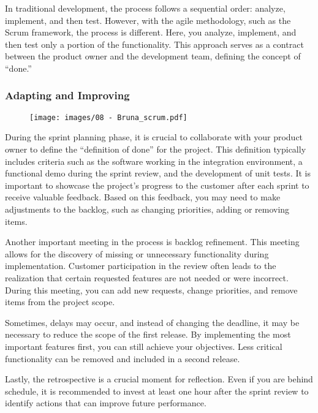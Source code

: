 In traditional development, the process follows a sequential order:
analyze, implement, and then test. However, with the agile methodology,
such as the Scrum framework, the process is different. Here, you
analyze, implement, and then test only a portion of the functionality.
This approach serves as a contract between the product owner and the
development team, defining the concept of ``done.''

\subsubsection{Adapting and Improving}

\begin{figure}[!h]
  \centering
  \texttt{[image: images/08 - Bruna\_scrum.pdf]}
\end{figure}

During the sprint planning phase, it is crucial to collaborate with your
product owner to define the ``definition of done'' for the project. This
definition typically includes criteria such as the software working in
the integration environment, a functional demo during the sprint review,
and the development of unit tests. It is important to showcase the
project's progress to the customer after each sprint to receive valuable
feedback. Based on this feedback, you may need to make adjustments to
the backlog, such as changing priorities, adding or removing items.

Another important meeting in the process is backlog refinement. This
meeting allows for the discovery of missing or unnecessary functionality
during implementation. Customer participation in the review often leads
to the realization that certain requested features are not needed or
were incorrect. During this meeting, you can add new requests, change
priorities, and remove items from the project scope.

Sometimes, delays may occur, and instead of changing the deadline, it
may be necessary to reduce the scope of the first release. By
implementing the most important features first, you can still achieve
your objectives. Less critical functionality can be removed and included
in a second release.

Lastly, the retrospective is a crucial moment for reflection. Even if
you are behind schedule, it is recommended to invest at least one hour
after the sprint review to identify actions that can improve future
performance.


